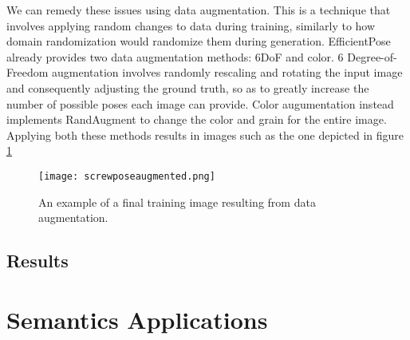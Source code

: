 We can remedy these issues using data augmentation. This is a technique that involves applying random changes to data during training, similarly to how domain randomization would randomize them during generation. EfficientPose already provides two data augmentation methods: 6DoF and color. 6 Degree-of-Freedom augmentation involves randomly rescaling and rotating the input image and consequently adjusting the ground truth, so as to greatly increase the number of possible poses each image can provide. Color augumentation instead implements RandAugment\cite{RandAugment} to change the color and grain for the entire image. Applying both these methods results in images such as the one depicted in figure \ref{fig:ScrewPoseAugmented}

\begin{figure}
    \texttt{[image: screwposeaugmented.png]}
    \caption{An example of a final training image resulting from data augmentation.}
    \label{fig:ScrewPoseAugmented}
\end{figure}

\subsection{Results}

\section{Semantics Applications}